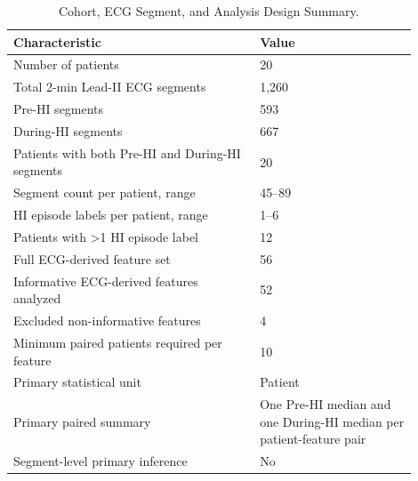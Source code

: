 \begin{table}
\caption{Cohort, ECG Segment, and Analysis Design Summary.}
\label{tab:cohort_segment_analysis_summary}
\begin{tabular}{p{0.55\linewidth}p{0.35\linewidth}}
\toprule
Characteristic & Value \\
\midrule
Number of patients & 20 \\
Total 2-min Lead-II ECG segments & 1,260 \\
Pre-HI segments & 593 \\
During-HI segments & 667 \\
Patients with both Pre-HI and During-HI segments & 20 \\
Segment count per patient, range & 45–89 \\
HI episode labels per patient, range & 1–6 \\
Patients with >1 HI episode label & 12 \\
Full ECG-derived feature set & 56 \\
Informative ECG-derived features analyzed & 52 \\
Excluded non-informative features & 4 \\
Minimum paired patients required per feature & 10 \\
Primary statistical unit & Patient \\
Primary paired summary & One Pre-HI median and one During-HI median per patient-feature pair \\
Segment-level primary inference & No \\
\bottomrule
\end{tabular}
\end{table}
